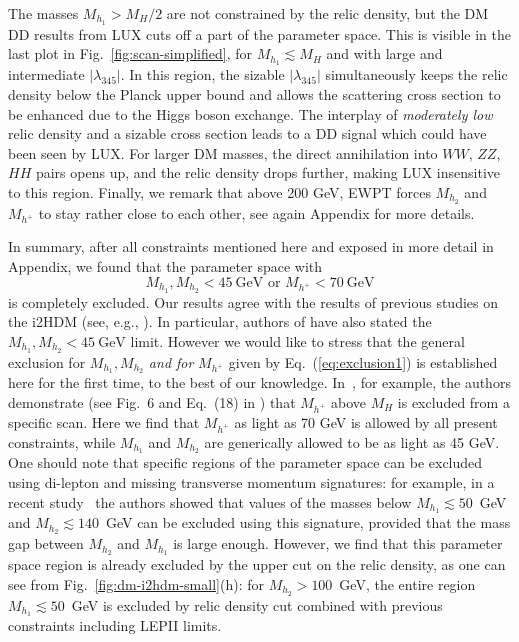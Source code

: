 \documentclass[12pt,a4paper]{article}
\newcommand {\blue} {\color{blue}}
\begin{document}
{The masses $M_{h_1} > M_H/2$ are not constrained by the relic density,
but the DM DD results from LUX cuts off a part of the parameter space.
This is visible in the last plot in Fig.~\ref{fig:scan-simplified},
for $M_{h_1}\lesssim M_H$ and with large and intermediate $|\lambda_{345}|$.
In this region, the sizable $|\lambda_{345}|$ simultaneously keeps the relic density below the Planck upper bound
and allows the scattering cross section to be enhanced due to the Higgs boson exchange.
The interplay of {\em moderately low} relic density and a sizable cross section leads to a DD signal
which could have been seen by LUX.
For larger DM masses, the direct annihilation into $WW$, $ZZ$, $HH$ pairs opens up,
and the relic density drops further, making LUX insensitive to this region.
Finally, we remark that above 200 GeV, EWPT forces $M_{h_2}$ and $M_{h^{+}}$ to stay rather close
to each other, see again Appendix for more details.}

{\blue In summary, after all constraints mentioned here and exposed in more detail in Appendix,}
we found that the parameter space with  
\begin{equation}
M_{h_1},M_{h_2}<45~\mbox{GeV} 
\mbox{\ or\ } M_{h^+}<70~\mbox{GeV} 
\label{eq:exclusion1}
\end{equation}
is completely excluded. Our results  agree with the results of previous studies on the i2HDM (see, e.g., \cite{Arhrib:2013ela,Ilnicka:2015jba}).
In particular, authors of \cite{Ilnicka:2015jba} have also stated 
the $M_{h_1},M_{h_2}<45~\mbox{GeV}$ limit.
However we would like to stress that the general exclusion 
for $M_{h_1},M_{h_2}$ {\it and for} $M_{h^+}$
given by Eq.~(\ref{eq:exclusion1}) is established here for the first time, to the best of our knowledge. In~\cite{Ilnicka:2015jba}, for example,  the authors demonstrate 
(see Fig.~6 and Eq.~(18) in \cite{Ilnicka:2015jba}) that 
$M_{h^+}$ above $M_H$ is excluded from a  specific scan. Here we find that
$M_{h^+}$ as light as 70 GeV  is allowed by all present constraints, while $M_{h_1}$ and
$M_{h_2}$ are generically allowed to be as light as 45 GeV. One should note that specific regions of the
parameter space can be excluded using di-lepton and missing transverse momentum
signatures: for example, in a recent study~\cite{Belanger:2015kga} the authors showed that values of the masses below
$M_{h_1}\lesssim 50$~GeV and  $M_{h_2}\lesssim 140$~GeV can be excluded using this signature,
provided that the mass gap between $M_{h_2}$ and $M_{h_1}$ is large enough. However, we find that this parameter
space region is already excluded by the upper cut on the relic density, as one can see
from Fig.~\ref{fig:dm-i2hdm-small}(h): for  $M_{h_2}>100$~GeV, the entire region $M_{h_1}\lesssim
50$~GeV  is excluded by relic density cut combined with previous constraints including LEPII limits.
\end{document}
